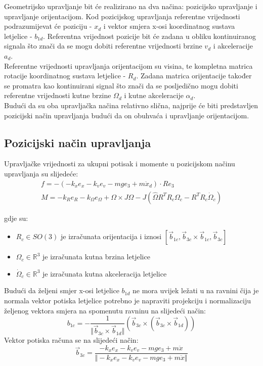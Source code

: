 \documentclass[times, utf8, diplomski]{fer}
\begin{document}
	Geometrijsko upravljanje bit će realizirano na dva načina: pozicijsko upravljanje i upravljanje orijentacijom. Kod pozicijskog upravljanja referentne vrijednosti podrazumijevat će poziciju - $x_d$ i vektor smjera x-osi koordinatnog sustava letjelice - $b_{1d}$. Referentna vrijednost pozicije bit će zadana u obliku kontinuiranog signala što znači da se mogu dobiti referentne vrijednosti brzine $v_d$ i akceleracije $a_d$. \\
	Referentne vrijednosti upravljanja orijentacijom su visina, te kompletna matrica rotacije koordinatnog sustava letjelice - $R_d$. Zadana matrica orijentacije također se promatra kao kontinuirani signal što znači da se posljedično mogu dobiti referentne vrijednosti kutne brzine $\Omega_d$ i kutne akceleracije $\alpha_d$. \\
	Budući da su oba upravljačka načina relativno slična, najprije će biti predstavljen pozicijski način upravljanja budući da on obuhvaća i upravljanje orijentacijom.  \\
	\subsection{Pozicijski način upravljanja}
	Upravljačke vrijednosti za ukupni potisak i momente u pozicijskom načinu upravljanja su slijedeće:
	\begin{gather}
		f = - (- k_x e_x - k_v e_v - mg e_3 + m \ddot{x}_d) \cdot Re_3 \label{thrust_ctrl} \\
		M = -k_R e_R - k_\Omega e_\Omega + \Omega \times J \Omega - J(\hat{\Omega}R^TR_c\Omega_c - R^TR_c\dot{\Omega}_c) \label{pos_moment}
	\end{gather}
	
	gdje su:
	\begin{itemize}
		\item $R_c \in SO(3)$ je izračunata orijentacija i iznosi $[\vec{b}_{1c}, \vec{b}_{3c} \times \vec{b}_{1c}, \vec{b}_{3c}]$ 
		\item $\Omega_c \in \mathbb{R}^3$ je izračunata kutna brzina letjelice 
		\item $\dot{\Omega}_c \in \mathbb{R}^3$ je izračunata kutna akceleracija letjelice
	\end{itemize}
	Budući da željeni smjer x-osi letjelice $b_{1d}$ ne mora uvijek ležati u na ravnini čija je normala vektor potiska letjelice potrebno je napraviti projekciju i normalizaciju željenog vektora smjera na spomenutu ravninu na slijedeći način:
	\begin{equation}
		b_{1c} = - \frac{1}{\Vert \vec{b}_{3c} \times \vec{b}_{1d} \Vert}(\vec{b}_{3c} \times (\vec{b}_{3c} \times \vec{b}_{1d}))
	\end{equation}
	Vektor potiska računa se na slijedeći način:
	\begin{equation}
		\vec{b}_{3c} = \frac{- k_x e_x - k_v e_v - mg e_3 + m \ddot{x}}{\Vert - k_x e_x - k_v e_v - mg e_3 + m \ddot{x} \Vert}
	\end{equation}
	
\end{document}

